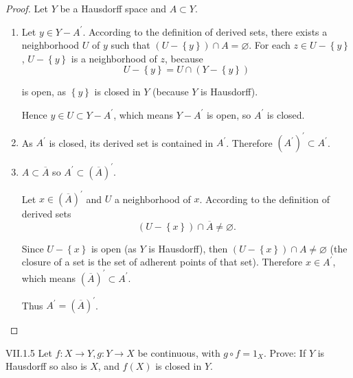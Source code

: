 \begin{proof}
	Let \( Y \) be a Hausdorff space and \( A \subset Y \).

	\begin{enumerate}[label={(\alph*)}]
		\item Let \( y \in Y - A^{\prime} \). According to the definition of derived sets, there exists a neighborhood \( U \) of \( y \) such that \( (U - \left\{ y \right\}) \cap A = \varnothing \). For each \( z \in U - \left\{ y \right\} \), \( U - \left\{ y \right\} \) is a neighborhood of \( z \), because
		      \[
			      U - \left\{ y \right\} = U \cap (Y - \left\{ y \right\})
		      \]

		      is open, as \( \left\{ y \right\} \) is closed in \( Y \) (because \( Y \) is Hausdorff).

		      Hence \( y \in U \subset Y - A^{\prime} \), which means \( Y - A^{\prime} \) is open, so \( A^{\prime} \) is closed.
		\item As \( A^{\prime} \) is closed, its derived set is contained in \( A^{\prime} \). Therefore \( {(A^{\prime})}^{\prime} \subset A^{\prime} \).
		\item \( A \subset \overline{A} \) so \( A^{\prime} \subset {(\overline{A})}^{\prime} \).

		      Let \( x \in {(\overline{A})}^{\prime} \) and \( U \) a neighborhood of \( x \). According to the definition of derived sets
		      \[
			      (U - \left\{ x \right\}) \cap \overline{A} \ne \varnothing.
		      \]

		      Since \( U - \left\{ x \right\} \) is open (as \( Y \) is Hausdorff), then \( (U - \left\{ x \right\}) \cap A \ne \varnothing \) (the closure of a set is the set of adherent points of that set). Therefore \( x \in A^{\prime} \), which means \( {(\overline{A})}^{\prime} \subset A^{\prime} \).

		      Thus \( A^{\prime} = {(\overline{A})}^{\prime} \).
	\end{enumerate}
\end{proof}

\begin{problem}{VII.1.5}
Let \( f: X \to Y, g: Y \to X \) be continuous, with \( g \circ f = 1_{X} \). Prove: If \( Y \) is Hausdorff so also is \( X \), and \( f(X) \) is closed in \( Y \).
\end{problem}

